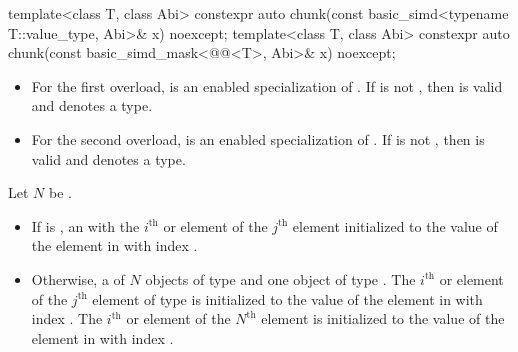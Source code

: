 \begin{itemdecl}
template<class T, class Abi>
  constexpr auto chunk(const basic_simd<typename T::value_type, Abi>& x) noexcept;
template<class T, class Abi>
  constexpr auto chunk(const basic_simd_mask<@@<T>, Abi>& x) noexcept;
\end{itemdecl}

\begin{itemdescr}
\pnum
\constraints
\begin{itemize}
 \item
   For the first overload,
    is an enabled specialization of .
   If 
   is not , then
    is valid and denotes a type.

 \item
   For the second overload,
    is an enabled specialization of .
   If 
   is not , then
    is valid and denotes a type.
\end{itemize}

\pnum
Let $N$ be .

\pnum
\returns
\begin{itemize}
 \item
   If  is , an  with the $i^\text{th}$  or 
   element of the $j^\text{th}$  element initialized to the value
   of the element in  with index .

 \item
   Otherwise, a  of $N$ objects of type  and one object
   of type .
   The $i^\text{th}$  or  element of
   the $j^\text{th}$  element of type  is initialized to
   the value of the element in  with index .
   The $i^\text{th}$  or  element of
   the $N^\text{th}$  element is initialized to the value of the
   element in  with index .
\end{itemize}
\end{itemdescr}

